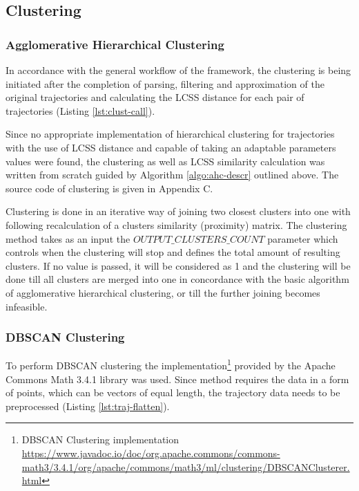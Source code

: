 \subsection{Clustering}

\subsubsection{Agglomerative Hierarchical Clustering}

In accordance with the general workflow of the framework, the clustering is being initiated after the completion of parsing, filtering and approximation of the original trajectories and calculating the LCSS distance for each pair of trajectories (Listing \ref{lst:clust-call}).



Since no appropriate implementation of hierarchical clustering for trajectories with the use of LCSS distance and capable of taking an adaptable parameters values were found, the clustering as well as LCSS similarity calculation was written from scratch guided by Algorithm \ref{algo:ahc-descr} outlined above. The source code of clustering is given in Appendix C.

Clustering is done in an iterative way of joining two closest clusters into one with following recalculation of a clusters similarity (proximity) matrix. The clustering method takes as an input the $OUTPUT\_CLUSTERS\_COUNT$ parameter which controls when the clustering will stop and defines the total amount of resulting clusters. If no value is passed, it will be considered as 1 and the clustering will be done till all clusters are merged into one in concordance with the basic algorithm of agglomerative hierarchical clustering, or till the further joining becomes infeasible.

\subsubsection{DBSCAN Clustering}

To perform DBSCAN clustering the implementation\footnote{DBSCAN Clustering implementation \url{https://www.javadoc.io/doc/org.apache.commons/commons-math3/3.4.1/org/apache/commons/math3/ml/clustering/DBSCANClusterer.html}} provided by the Apache Commons Math 3.4.1 library was used. Since method requires the data 
in a form of points, which can be vectors of equal length, the trajectory data needs to be preprocessed (Listing \ref{lst:traj-flatten}).

